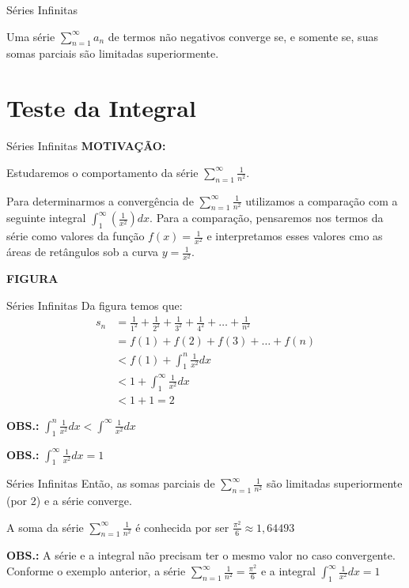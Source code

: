 \documentclass[hyperref={pdfpagelabels=false}]{beamer}
\begin{document}
\begin{frame}{Séries Infinitas}
    \begin{corollary}
        Uma série $\displaystyle \sum_{n=1}^{\infty}a_n$ de termos não negativos converge se, e somente se, suas somas parciais são limitadas superiormente.
    \end{corollary}

\end{frame}

\section{Teste da Integral}

\begin{frame}{Séries Infinitas}
    {\bf MOTIVAÇÃO:}
    
    Estudaremos o comportamento da série $\displaystyle \sum_{n=1}^{\infty}\frac{1}{n^2}$. \pause
    
    Para determinarmos a convergência de $\displaystyle \sum_{n=1}^{\infty}\frac{1}{n^2}$ utilizamos a comparação com a seguinte integral $\displaystyle \int_1^{\infty}\left(\frac{1}{x^2}\right)dx$. Para a comparação, pensaremos nos termos da série como valores da função $f(x) = \displaystyle \frac{1}{x^2}$ e interpretamos esses valores cmo as áreas de retângulos sob a curva $y = \displaystyle \frac{1}{x^2}$. \pause
    
    {\bf FIGURA}
\end{frame}

\begin{frame}{Séries Infinitas}
    Da figura temos que:
    \begin{align*}
        s_n &= \frac{1}{1^2} + \frac{1}{2^2} + \frac{1}{3^2} + \frac{1}{4^2} + \dots + \frac{1}{n^2} \\
        &= f(1) + f(2) + f(3) + \dots + f(n) \\
        &< f(1) + \int_1^{n}\frac{1}{x^2}dx \\
        &< 1 + \int_1^{\infty}\frac{1}{x^2}dx \\
        &< 1 + 1 = 2
    \end{align*}

    {\bf OBS.:} $\displaystyle \int_1^n\frac{1}{x^2}dx < \int^{\infty} \frac{1}{x^2}dx$
    
    {\bf OBS.:} $\displaystyle \int_1^{\infty}\frac{1}{x^2}dx = 1$
\end{frame}

\begin{frame}{Séries Infinitas}
    Então, as somas parciais de $\displaystyle \sum_{n=1}^{\infty}\frac{1}{n^2}$ são limitadas superiormente (por 2) e a série converge. \pause
    
    A soma da série $\displaystyle \sum_{n=1}^{\infty}\frac{1}{n^2}$ é conhecida por ser $\displaystyle \frac{\pi^2}{6} \approx 1,64493$ \pause
    
    {\bf OBS.:} A série e a integral não precisam ter o mesmo valor no caso convergente. Conforme o exemplo anterior, a série $\displaystyle \sum_{n=1}^{\infty}\frac{1}{n^2} = \displaystyle \frac{\pi^2}{6}$ e a integral $\displaystyle \int_1^{\infty}\frac{1}{x^2}dx = 1$
\end{frame}
\end{document}
